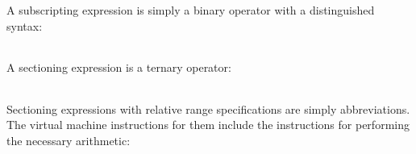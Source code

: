 \begin{noIndex}
\begin{center}
\begin{xtabular}{|m{1.9073598in}|m{2.75596in}|}
\end{xtabular}
\end{center}

A subscripting expression is simply a binary operator with a
distinguished syntax:

\begin{center}
\tablelasttail{\hline}
\begin{xtabular}{|m{1.9073598in}|m{2.75596in}|}

\end{xtabular}
\end{center}

A sectioning expression is a ternary operator:

\begin{center}
\tablelasttail{\hline}
\begin{xtabular}{|m{1.9073598in}|m{2.75596in}|}

\end{xtabular}
\end{center}

Sectioning expressions with relative range specifications are simply
abbreviations. The virtual machine instructions for them include the
instructions for performing the necessary arithmetic:

\begin{center}
\tablelasttail{\hline}
\begin{xtabular}{|m{1.9073598in}|m{2.75596in}|}


\end{xtabular}
\end{center}
\end{noIndex}
